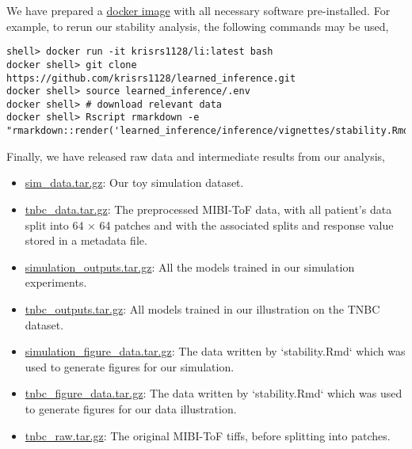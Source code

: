 We have prepared a \href{https://hub.docker.com/r/krisrs1128/li}{docker image}
with all necessary software pre-installed. For example, to rerun our stability
analysis, the following commands may be used,

\begin{verbatim}
shell> docker run -it krisrs1128/li:latest bash
docker shell> git clone https://github.com/krisrs1128/learned_inference.git
docker shell> source learned_inference/.env
docker shell> # download relevant data
docker shell> Rscript rmarkdown -e "rmarkdown::render('learned_inference/inference/vignettes/stability.Rmd')"
\end{verbatim}

Finally, we have released raw data and intermediate results from our analysis,
\begin{itemize}
\item
  \href{https://drive.google.com/file/d/1v_Ndux1Rmk2q1ul5Vv5srgI1JQ17Vx0n/view?usp=sharing}{sim\_data.tar.gz}:
  Our toy simulation dataset.
\item \href{https://drive.google.com/file/d/1KMG5yrty8UEPhrR0Y7hIZrtwWuP_y-cm/view?usp=sharing}{tnbc\_data.tar.gz}: The preprocessed MIBI-ToF data, with all
  patient's data split into 64 $\times$ 64 patches and with the associated
  splits and response value stored in a metadata file.
\item \href{https://drive.google.com/file/d/1QVmyqYQCe8C04rAyBQxXuZYuaiYleopx/view?usp=sharing}{simulation\_outputs.tar.gz}: All the models trained in our
  simulation experiments.
\item \href{https://drive.google.com/file/d/1DmzObBWCzVzDNZ1DxcUWgyIoZmC4H8gD/view?usp=sharing}{tnbc\_outputs.tar.gz}: All models trained in our illustration on
  the TNBC dataset.
\item \href{https://drive.google.com/file/d/1zJQOB2dSuy_1WYheJtUI8PZfu9PsyVGQ/view?usp=sharing}{simulation\_figure\_data.tar.gz}: The data written by
  `stability.Rmd` which was used to generate figures for our simulation.
\item \href{https://drive.google.com/file/d/1FaCrOysBlsNYgzul6iJiFcmgRFl2OaSE/view?usp=sharing}{tnbc\_figure\_data.tar.gz}: The data written by `stability.Rmd`
  which was used to generate figures for our data illustration.
\item \href{https://drive.google.com/file/d/1c-ZPs9RbzkY9FzUnCCVJc8syt5dpj-4Y/view?usp=sharing}{tnbc\_raw.tar.gz}:
  The original MIBI-ToF tiffs, before splitting into patches.
\end{itemize}

